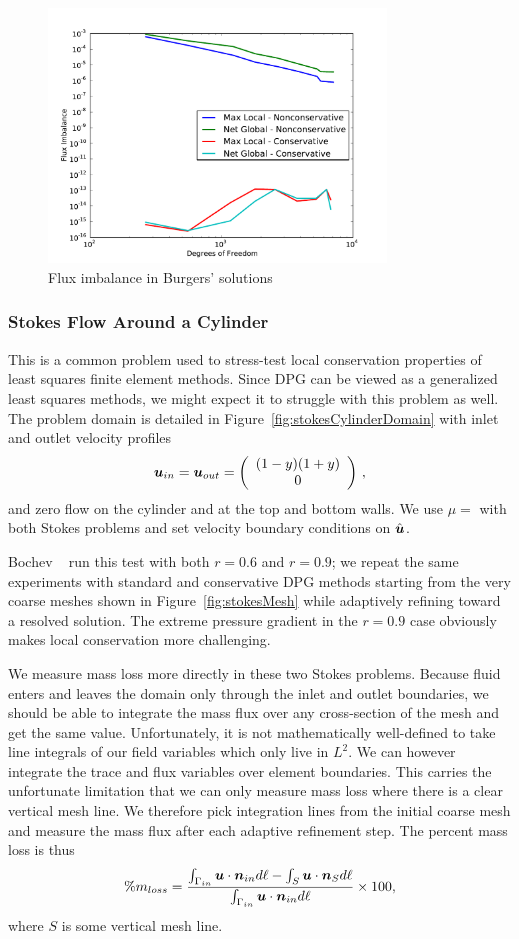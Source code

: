 \documentclass[Proposal.tex]{subfiles}
\begin{document}
\begin{figure}[p]
\centering
\includegraphics[width=0.8\textwidth]{figs/Burgers/graphFlux.pdf}
\caption{Flux imbalance in Burgers' solutions}
\label{fig:burgers_flux}
\end{figure}

\subsubsection{Stokes Flow Around a Cylinder}\label{sec:stokesCylinder}
This is a common problem used to stress-test local conservation properties of
least squares finite element methods. Since DPG can be viewed as a generalized
least squares methods\cite{DPGOverview2}, we might expect it to struggle with
this problem as well. The problem domain is detailed in
Figure~\ref{fig:stokesCylinderDomain} with inlet and outlet velocity profiles
\[
\boldsymbol u_{in}=\boldsymbol u_{out}=\left( \begin{array}{c} (1-y)(1+y)\\ 0\\ \end{array} \right)\,,
\]
and zero flow on the cylinder and at the top and bottom walls. We use $\mu=$
with both Stokes problems and set velocity boundary conditions on $\hat{\boldsymbol u}$.

Bochev \etal~\cite{Bochev2010} run this test with both $r=0.6$ and $r=0.9$; we
repeat the same experiments with standard and conservative DPG methods
starting from the very coarse meshes shown in Figure~\ref{fig:stokesMesh}
while adaptively refining toward a resolved solution. The extreme pressure
gradient in the $r=0.9$ case obviously makes local conservation more
challenging.

We measure mass loss more directly in these two Stokes problems. Because
fluid enters and leaves the domain only through the inlet and outlet
boundaries, we should be able to integrate the mass flux over any
cross-section of the mesh and get the same value. Unfortunately, it is not
mathematically well-defined to take line integrals of our field variables which only
live in $L^2$. We can however integrate the trace and flux variables over element boundaries.
This carries the unfortunate limitation that we can only measure mass loss
where there is a clear vertical mesh line. We therefore pick integration lines
from the initial coarse mesh and measure the mass flux after each adaptive refinement
step. The percent mass loss is thus
\[
\%m_{loss}=\frac{\int_{\Gamma_{in}}\boldsymbol u\cdot\boldsymbol n_{in}d\ell-\int_S\boldsymbol u\cdot\boldsymbol n_Sd\ell}
{\int_{\Gamma_{in}}\boldsymbol u\cdot\boldsymbol n_{in}d\ell}\times100,
\]
where $S$ is some vertical mesh line.
\end{document}
